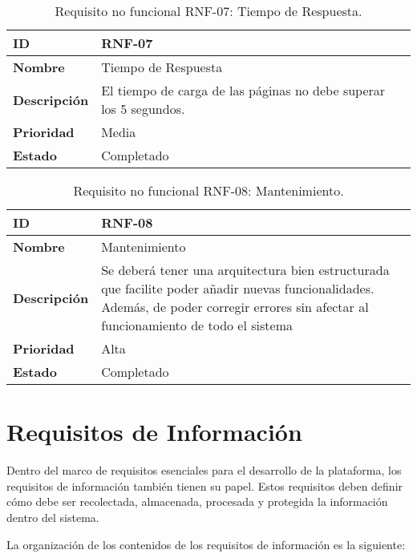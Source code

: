 \begin{table}[H]
    \centering
    \begin{tabular}{|l|p{9.5cm}|}
        \hline
        \textbf{ID} & RNF-07 \\
        \hline
        \textbf{Nombre} & Tiempo de Respuesta \\
        \hline
        \textbf{Descripción} & El tiempo de carga de las páginas no debe superar los 5 segundos. \\
        \hline
        \textbf{Prioridad} & Media \\
        \hline
        \textbf{Estado} & Completado \\
        \hline
    \end{tabular}
    \caption{Requisito no funcional RNF-07: Tiempo de Respuesta.}
    \label{table:req-RNF38}
\end{table}


\begin{table}[H]
    \centering
    \begin{tabular}{|l|p{9.5cm}|}
        \hline
        \textbf{ID} & RNF-08 \\
        \hline
        \textbf{Nombre} & Mantenimiento \\
        \hline
        \textbf{Descripción} & Se deberá tener una arquitectura bien estructurada que facilite poder añadir nuevas funcionalidades. Además, de poder corregir errores sin afectar al funcionamiento de todo el sistema  \\
        \hline
        \textbf{Prioridad} & Alta \\
        \hline
        \textbf{Estado} & Completado \\
        \hline
    \end{tabular}
    \caption{Requisito no funcional RNF-08: Mantenimiento.}
    \label{table:req-RNF39}
\end{table}

\section{Requisitos de Información}

Dentro del marco de requisitos esenciales para el desarrollo de la plataforma, los requisitos de información también tienen su papel. Estos requisitos deben definir cómo debe ser recolectada, almacenada, procesada y protegida la información dentro del sistema. 

La organización de los contenidos de los requisitos de información es la siguiente:

